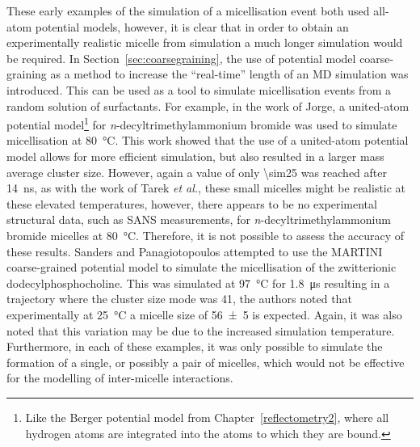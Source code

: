 These early examples of the simulation of a micellisation event both used all-atom potential models,\autocite{tarek_molecular_1998,maillet_large_1999} however, it is clear that in order to obtain an experimentally realistic micelle from simulation a much longer simulation would be required.
In Section~\ref{sec:coarsegraining}, the use of potential model coarse-graining as a method to increase the ``real-time'' length of an MD simulation was introduced.
This can be used as a tool to simulate micellisation events from a random solution of surfactants.
For example, in the work of Jorge,\autocite{jorge_molecular_2008} a united-atom potential model\footnote{Like the Berger potential model from Chapter~\ref{reflectometry2}, where all hydrogen atoms are integrated into the atoms to which they are bound.} for \emph{n}-decyltrimethylammonium bromide was used to simulate micellisation at \SI{80}{\celsius}.
This work showed that the use of a united-atom potential model allows for more efficient simulation, but also resulted in a larger mass average cluster size.
However, again a value of only \num{\sim25} was reached after \SI{14}{\nano\second}, as with the work of Tarek \emph{et al.},\autocite{tarek_molecular_1998} these small micelles might be realistic at these elevated temperatures, however, there appears to be no experimental structural data, such as SANS measurements, for \emph{n}-decyltrimethylammonium bromide micelles at \SI{80}{\celsius}.
Therefore, it is not possible to assess the accuracy of these results.
Sanders and Panagiotopoulos attempted to use the MARTINI coarse-grained potential model to simulate the micellisation of the zwitterionic dodecylphosphocholine.\autocite{sanders_micellization_2010}
This was simulated at \SI{97}{\celsius} for \SI{1.8}{\micro\second} resulting in a trajectory where the cluster size mode was 41, the authors noted that experimentally at \SI{25}{\celsius} a micelle size of \num{56\pm5} is expected.
Again, it was also noted that this variation may be due to the increased simulation temperature.\autocite{malliaris_temperature_1985,kamenka_aqueous_1995}
Furthermore, in each of these examples, it was only possible to simulate the formation of a single, or possibly a pair of micelles, which would not be effective for the modelling of inter-micelle interactions.

